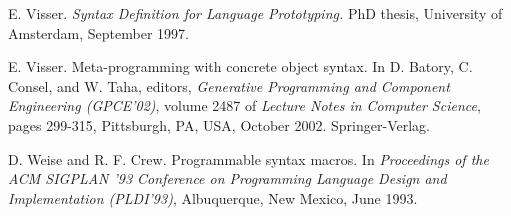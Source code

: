 \documentclass[a4paper,11pt]{article}
\begin{document}
\begin{thebibliography}{99}
E. Visser. \emph{Syntax Definition for Language Prototyping.} PhD
thesis, University of Amsterdam, September 1997.

E. Visser. Meta-programming with concrete object syntax. In D. Batory,
C. Consel, and W. Taha, editors, \emph{Generative Programming and Component Engineering
(GPCE'02)}, volume 2487 of \emph{Lecture Notes in Computer Science}, pages 299-315, Pittsburgh,
PA, USA, October 2002. Springer-Verlag.

D. Weise and R. F. Crew. Programmable syntax macros. In \emph{Proceedings
of the ACM SIGPLAN '93 Conference on Programming Language Design and Implementation
(PLDI'93)}, Albuquerque, New Mexico, June 1993.

\end{thebibliography}
\end{document}
